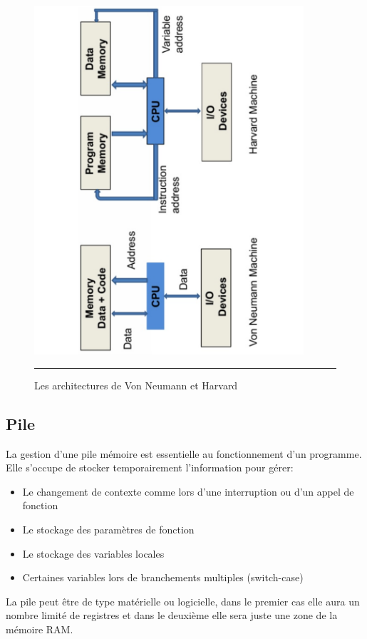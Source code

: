 \begin{figure}[htb]
  \centering
  \includegraphics[angle=270,width=10cm,trim=50 1 50 1,clip]{./Figures/cpu/vonneumann.pdf}
  \rule{35em}{0.5pt}
  \caption[vn]{Les architectures de Von Neumann et Harvard}
  \label{fig:vn}
\end{figure}

\subsection{Pile}
La gestion d'une pile mémoire est essentielle au fonctionnement d'un programme. Elle s'occupe de stocker temporairement l'information pour gérer:
\begin{itemize}[label=\textbullet,font=\small]
\item Le changement de contexte comme lors d'une interruption ou d'un appel de fonction
\item Le stockage des paramètres de fonction
\item Le stockage des variables locales
\item Certaines variables lors de branchements multiples (switch-case)
\end{itemize}
La pile peut être de type matérielle ou logicielle, dans le premier cas elle aura un nombre limité de registres et dans le deuxième elle sera juste une zone de la mémoire RAM.

